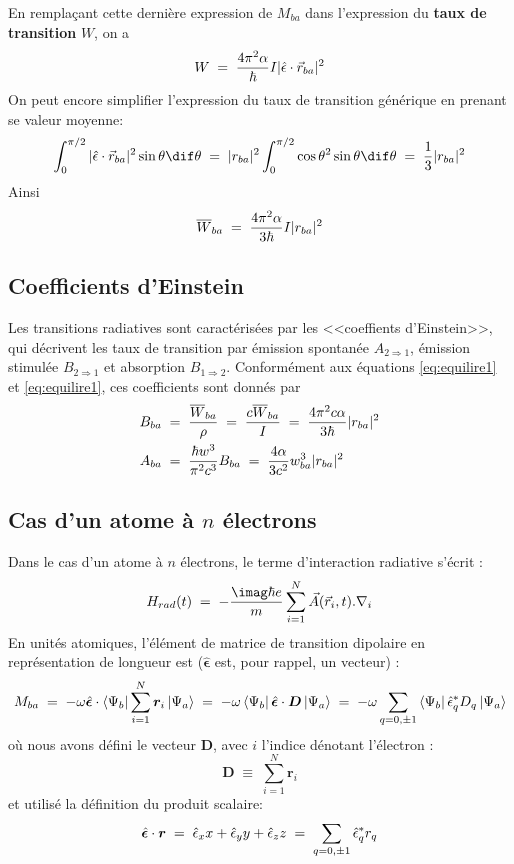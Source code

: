 En remplaçant cette dernière expression de $M_{ba}$ dans l'expression du \textbf{taux de transition} $W$, on a
\[
    W\; = \; \dfrac{4\pi^2 \alpha}{\hbar}I |\hat{\epsilon}\cdot\vec{r}_{ba}|^2
\]
On peut encore simplifier l'expression du taux de transition générique en prenant se valeur moyenne:
\[
    \int_{0}^{\pi/2} |\hat{\epsilon}\cdot\vec{r}_{ba}|^2\sin{\theta} \dif\theta\eq |r_{ba}|^2\int_{0}^{\pi/2}\cos{\theta}^2\sin{\theta}\dif\theta\eq \dfrac{1}{3}|r_{ba}|^2
\]
Ainsi
\begin{equation}
    \overline{W}_{ba}\; = \; \dfrac{4\pi^2 \alpha}{3 \hbar}I |r_{ba}|^2
\end{equation}



\subsection{Coefficients d'Einstein}
Les transitions radiatives sont caractérisées par les <<coeffients d'Einstein>>, qui décrivent les taux de transition par émission spontanée $A_{2\Rightarrow1}$, émission stimulée $B_{2\Rightarrow 1}$ et absorption $B_{1\Rightarrow2}$. Conformément aux équations \eqref{eq:equilire1} et \eqref{eq:equilire1}, ces coefficients sont donnés par
\begin{align}
    B_{ba} &\; = \; \dfrac{\overline{W}_{ba}}{\rho}\; = \; \dfrac{c\overline{W}_{ba}}{I}\; = \; \dfrac{4\pi^2 c \alpha}{3 \hbar}|r_{ba}|^2 \\
    A_{ba} &\; = \; \dfrac{\hbar w^3}{\pi^2 c^3}B_{ba}\; = \; \dfrac{4 \alpha}{3 c^2}w_{ba}^3|r_{ba}|^2
\end{align}

\subsection{Cas d'un atome à $n$ électrons}
Dans le cas d'un atome à $n$ électrons, le terme d'interaction radiative s'écrit :
\begin{equation}
    H_{rad}(t)\eq -\dfrac{\imag\hbar e}{m}\sum_{i=1}^{N} \vec{A}(\vec{r}_i,t).\nabla_i
\end{equation}
En unités atomiques, l'élément de matrice de transition dipolaire en représentation de longueur est ($\hat{\bm{\epsilon}}$ est, pour rappel, un vecteur) :
\begin{equation}
    M_{ba} \; = \;
    -\omega \hat{\bm{\epsilon}}\cdot\bra{\Psi_b}\sum_{i=1}^{N} \bm{r}_i\ket{\Psi_a}
    \; = \;
    -\omega \bra{\Psi_b}\hat{\bm{\epsilon}} \cdot \bm{D}\ket{\Psi_a}
    \; = \;
    -\omega \sum_{q=0,\pm 1}\bra{\Psi_b}\hat{\epsilon}_q^* D_q\ket{\Psi_a}
\end{equation}
où nous avons défini le vecteur $\bm{D}$, avec $i$ l'indice dénotant l'électron :
\[
    \bm{D} \;\equiv\; \sum_{i=1}^N \bm{r}_i
\]
et utilisé la définition du produit scalaire:
\begin{equation}
    \hat{\bm{\epsilon}}\cdot \bm{r} \; = \; \hat{\epsilon}_xx + \hat{\epsilon}_yy + \hat{\epsilon}_zz \; = \; \sum_{q=0,\pm 1}  \hat{\epsilon}_q^* r_q
\end{equation}


